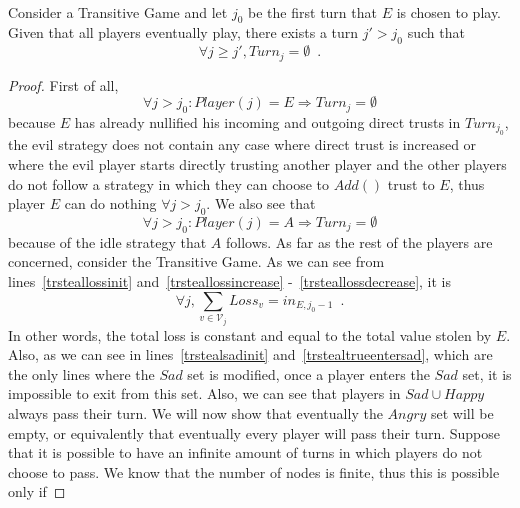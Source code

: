 \documentclass[11pt]{llncs}
\begin{document}
    \begin{theorem} \ \\
       \label{convergence}
       Consider a Transitive Game and let $j_0$ be the first turn that $E$ is chosen to play. Given that all players
       eventually play, there exists a turn $j' > j_0$ such that
       \begin{equation}
          \forall j \geq j', Turn_j = \emptyset \enspace.
       \end{equation}
    \end{theorem}
    \begin{proof}
       First of all,
       \begin{equation}
          \forall j > j_0 : Player\left(j\right) = E \Rightarrow Turn_j = \emptyset
       \end{equation}
        because $E$ has already nullified his incoming and outgoing direct trusts in $Turn_{j_0}$, the evil strategy does not
       contain any case where direct trust is increased or where the evil player starts directly trusting another player and
       the other players do not follow a strategy in which they can choose to $Add\left(\right)$ trust to $E$, thus player
       $E$ can do nothing $\forall j > j_0$. We also see that
       \begin{equation}
          \forall j > j_0 : Player(j) = A \Rightarrow Turn_j = \emptyset
       \end{equation}
       because of the idle strategy that $A$ follows. As far as the rest of the players are concerned, consider the
       Transitive Game. As we can see from lines~\ref{trsteallossinit} and~\ref{trsteallossincrease}
       -~\ref{trsteallossdecrease}, it is
       \begin{equation}
          \forall j, \sum\limits_{v \in \mathcal{V}_j}Loss_v = in_{E, j_0-1} \enspace.
       \end{equation}
       In other words, the total loss is constant and equal to the total value stolen by $E$. Also, as we can see in
       lines~\ref{trstealsadinit} and~\ref{trstealtrueentersad}, which are the only lines where the $Sad$ set is modified,
       once a player enters the $Sad$ set, it is impossible to exit from this set. Also, we can see that players in $Sad
       \cup Happy$ always pass their turn. We will now show that eventually the $Angry$ set will be empty, or equivalently
       that eventually every player will pass their turn. Suppose that it is possible to have an infinite amount of turns
       in which players do not choose to pass. We know that the number of nodes is finite, thus this is possible only if

\end{proof}
\end{document}
